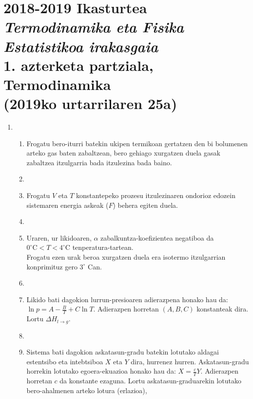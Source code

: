 \documentclass[10pt]{article}              %
\begin{document}




\section*{2018-2019 Ikasturtea\\
\textit{Termodinamika eta Fisika Estatistikoa irakasgaia}\\
1. azterketa partziala, Termodinamika\\
(2019ko urtarrilaren 25a)}

\vspace{2.5cm}


\begin{enumerate}



\item 
	\begin{enumerate}
	\item Frogatu bero-iturri batekin ukipen termikoan gertatzen den bi bolumenen arteko gas baten zabaltzean, bero gehiago xurgatzen duela gasak zabaltzea itzulgarria bada itzulezina bada baino.
	\item[] 	
	\item Frogatu $V$ eta $T$ konstantepeko prozesu itzulezinaren ondorioz edozein sistemaren energia askeak ($F$) behera egiten duela.
	\item[] 
	\item Uraren, ur likidoaren, $\alpha$ zabalkuntza-koefizientea negatiboa da $0^{\circ} \textrm{C}< T < 4^{\circ} \textrm{C}$ tenperatura-tartean.\\ 
	Frogatu ezen urak beroa xurgatzen duela era isotermo itzulgarrian konprimituz gero $3^{\circ}$ Can.
	\item[] 
	\item Likido bati dagokion lurrun-presioaren adierazpena honako hau da: $\ln p = A - \frac{B}{T} + C\ln T$. Adierazpen horretan $(A, B, C)$ konstanteak dira. Lortu $\Delta H_{l\to g}$.
	\item[] 
	\item Sistema bati dagokion askatasun-gradu batekin lotutako aldagai estentsibo eta intebtsiboa $X$ eta $Y$ dira, hurrenez hurren. Askatasun-gradu horrekin lotutako egoera-ekuazioa honako hau da: $ X = \frac{c}{T} Y $. Adierazpen horretan $c$ da konstante ezaguna. Lortu askatasun-graduarekin lotutako bero-ahalmenen arteko lotura (erlazioa),
	\end{enumerate}
	

\end{enumerate}
\end{document}

